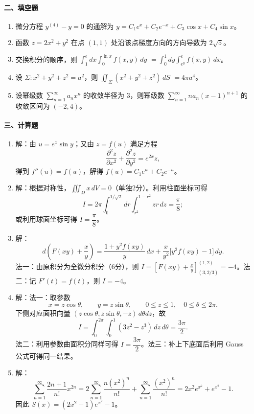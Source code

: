 \paragraph*{二、填空题}
\begin{enumerate}
  \item 微分方程 $y^{(4)}-y=0$ 的通解为 $y=C_1e^x+C_2e^{-x}+C_3\cos x+C_4\sin x$。
  \item 函数 $z=2x^2+y^2$ 在点 $(1,1)$ 处沿该点梯度方向的方向导数为 $2\sqrt5$。
  \item 交换积分的顺序，则 $\displaystyle\int_1^e dx\int_0^{\ln x} f(x,y)\,dy$ $=\displaystyle\int_0^1dy\int_{e^y}^{e}f(x,y)\,dx$。
  \item 设 $\Sigma:x^2+y^2+z^2=a^2$，则 $\displaystyle\iint_{\Sigma}(x^2+y^2+z^2)\,dS$ $=4\pi a^4$。
  \item 设幂级数 $\displaystyle\sum_{n=1}^{\infty}a_nx^n$ 的收敛半径为 $3$，则幂级数 $\displaystyle\sum_{n=1}^{\infty}n a_n(x-1)^{n+1}$ 的收敛区间为 $(-2,4)$。
\end{enumerate}

\paragraph*{三、计算题}
\begin{enumerate}
  \item 解：由 $u=e^x\sin y$；又由 $z=f(u)$ 满足方程
  \[
    \frac{\partial^2 z}{\partial x^2}
    +\frac{\partial^2 z}{\partial y^2}=e^{2x}z,
  \]
  得到 $f''(u)=f(u)$，解得 $f(u)=C_1e^u+C_2e^{-u}$。
  \item 解：根据对称性，$\displaystyle\iiint_{\Omega}x\,dV=0$（单独2分）。利用柱面坐标可得
  \[
    I=2\pi\int_0^{1/\sqrt2}dr\int_{r^2}^{1-r^2}zr\,dz
    =\frac{\pi}{8};
  \]
  或利用球面坐标可得 $I=\dfrac{\pi}{8}$。
  \item 解：
  \[
    d\left(F(xy)+\frac{x}{y}\right)
    =\frac{1+y^2f(xy)}{y}\,dx
    +\frac{x}{y^2}\bigl[y^2f(xy)-1\bigr]\,dy.
  \]
  法一：由原积分为全微分积分（6分），则
  \(\displaystyle I=\left[F(xy)+\frac{x}{y}\right]_{(3,2/3)}^{(1,2)}=-4\)。法二：记 $F'(t)=f(t)$，则 $I=-4$。
  \item 解：法一：取参数
  \[
    x=z\cos\theta,\qquad y=z\sin\theta,\qquad
    0\le z\le1,\quad 0\le\theta\le2\pi.
  \]
  下侧对应面积向量 $(z\cos\theta,z\sin\theta,-z)\,d\theta dz$，故
  \[
    I=\int_0^{2\pi}\int_0^1(3z^2-z^3)\,dz\,d\theta
    =\frac{3\pi}{2}.
  \]
  法二：利用参数曲面积分同样可得 $I=\dfrac{3\pi}{2}$。法三：补上下底面后利用 Gauss 公式可得同一结果。
  \item 解：
  \[
    \sum_{n=1}^{\infty}\frac{2n+1}{n!}x^{2n}
    =2\sum_{n=1}^{\infty}\frac{n(x^2)^n}{n!}
    +\sum_{n=1}^{\infty}\frac{(x^2)^n}{n!}
    =2x^2e^{x^2}+e^{x^2}-1.
  \]
  因此 $S(x)=(2x^2+1)e^{x^2}-1$。
\end{enumerate}

